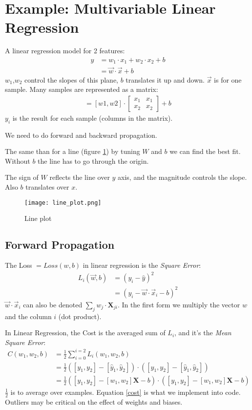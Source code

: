 \section{Example: Multivariable Linear Regression}
A linear regression model for 2 features:
\begin{align*}
 y &= w_1\cdot x_1 + w_2\cdot x_2 + b \\
   &= \vec{w}\cdot\vec{x} + b
\end{align*}
$w_1$,$w_2$ control the slopes of this plane, $b$ translates it up and down. $\vec{x}$ is for one sample. Many samples are represented as a matrix:
\begin{align}
[y1, y2] = 
  [w1, w2]\cdot{}
  \begin{bmatrix}
  x_1 & x_1\\
  x_2 & x_2 
  \end{bmatrix}
 +  b
\end{align}
$y_i$ is the result for each sample (columns in the matrix).

We need to do forward and backward propagation.

The same than for a line (figure \ref{fig:line}) by tuning $W$ and $b$  we can find the best fit. Without $b$ the line has to go through the origin. 

The sign of $W$ reflects the line over $y$ axis, and the magnitude controls the slope. Also $b$ translates over $x$.

\begin{figure}[h]
 \centering
 \texttt{[image: line\_plot.png]}
  \caption{Line plot} \label{fig:line}
\end{figure}


\subsection{Forward Propagation}
The Loss $= Loss(w,b)$ in linear regression is the \textit{Square Error}:
\begin{align*}
  L_i(\vec{w}, b) &= (y_i - \hat{y})^2\\
  &=(y_i -\vec{w}\cdot{}\vec{x}_{i} -b)^2
\end{align*}
$\vec{w}\cdot{}\vec{x}_i$ can also be denoted $\sum_jw_j\cdot{}\mathbf{X}_{ji}$. In the first form we multiply the vector $w$ and the column $i$ (dot product).

In Linear Regression, the Cost is the averaged sum of $L_i$, and it's the \textit{Mean Square Error}:
\begin{align}
  C(w_1, w_2, b) &= \frac{1}{2} \sum_{i=0}^{i=2} L_i(w_1, w_2, b)\\
  &= \frac{1}{2}([y_1, y_2] - [\hat{y}_1, \hat{y}_2])\cdot{}([y_1, y_2]-[\hat{y}_1, \hat{y}_2])\\
  &=\frac{1}{2}([y_1, y_2] - [w_1, w_2]\mathbf{X}-b)\cdot{}([y_1, y_2] - [w_1,w_2]\mathbf{X} -b) \label{cost}
\end{align}
$\frac{1}{2}$ is to average over examples. Equation \ref{cost} is what we implement into code.
Outliers may be critical on the effect of weights and biases.

